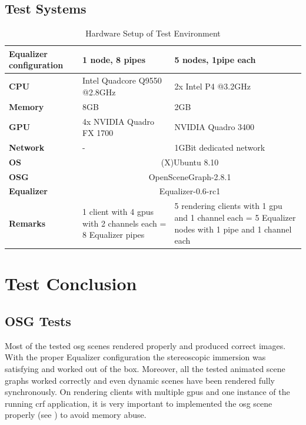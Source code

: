 \subsection{Test Systems}
\begin{table}[H]
	\centering
	\begin{tabular}{|p{}|p{}|p{}|}
			\hline \bfseries Equalizer configuration & 1 node, 8 pipes & 5 nodes, 1pipe each \\
			\hline \bfseries CPU & Intel Quadcore Q9550 @2.8GHz & 2x Intel P4 @3.2GHz \\
			\hline \bfseries Memory & 8GB & 2GB \\
			\hline \bfseries GPU & 4x NVIDIA Quadro FX 1700 & NVIDIA Quadro 3400 \\
			\hline \bfseries Network & \quad\quad- & 1GBit dedicated network \\
			\hline \bfseries OS & \multicolumn{2}{c|}{(X)Ubuntu 8.10} \\
			\hline \bfseries OSG & \multicolumn{2}{c|}{OpenSceneGraph-2.8.1}\\
			\hline \bfseries Equalizer & \multicolumn{2}{c|}{Equalizer-0.6-rc1}\\
			\hline \bfseries Remarks & 1 client with 4 \gls{gpu}s with 2 channels each = 8 Equalizer pipes  & 5 rendering clients with 1 \gls{gpu} and 1 channel each = 5 Equalizer nodes with 1 pipe and 1 channel each \\
			\hline
		\end{tabular}
	\caption{Hardware Setup of Test Environment}
	\label{tab:theUsedTestSystems}
\end{table}

\section{Test Conclusion}

\subsection{OSG Tests}
Most of the tested \gls{osg} scenes rendered properly and produced correct images. With the proper Equalizer configuration the stereoscopic immersion was satisfying and worked out of the box. Moreover, all the tested animated scene graphs worked correctly and even dynamic scenes have been rendered fully synchronously. On rendering clients with multiple \gls{gpu}s and one instance of the running \gls{crf} application, it is very important to implemented the \gls{osg} scene properly (see ) to avoid memory abuse.

